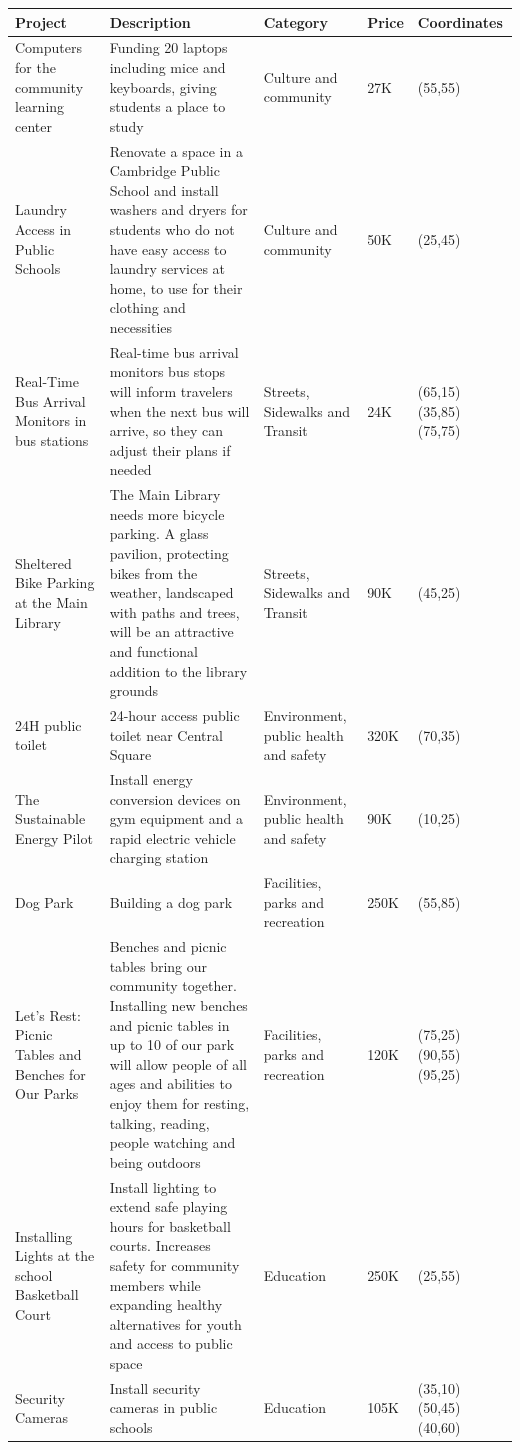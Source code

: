 \documentclass[letterpaper]{article} %
\begin{document}
\begin{table}[ht!]
  \begin{center}
    \begin{tabular}{|p{2cm}|p{8cm}|p{3cm}|p{1cm}|p{2cm}|}
    \hline
    \textbf{Project} & \textbf{Description} & \textbf{Category} & \textbf{Price} & \textbf{Coordinates}\\
    \hline
    Computers for the community learning center & Funding 20 laptops including mice and keyboards, giving students a place to study & Culture and community &  27K & (55,55)\\
    \hline
    Laundry Access in Public Schools & Renovate a space in a Cambridge Public School and install washers and dryers for students who do not have easy access to laundry services at home, to use for their clothing and necessities & Culture and community & 50K & (25,45)\\
    \hline
    Real-Time Bus Arrival Monitors in bus stations & Real-time bus arrival monitors bus stops will inform travelers when the next bus will arrive, so they can adjust their plans if needed &  Streets, Sidewalks and Transit &  24K & (65,15) (35,85) (75,75)\\
    \hline
    Sheltered Bike Parking at the Main Library & The Main Library needs more bicycle parking. A glass pavilion, protecting bikes from the weather, landscaped with paths and trees, will be an attractive and functional addition to the library grounds & Streets, Sidewalks and Transit & 90K & (45,25)\\
    \hline
    24H public toilet & 24-hour access public toilet near Central Square & Environment, public health and safety & 320K & (70,35)\\
    \hline
    The Sustainable Energy Pilot & Install energy conversion devices on gym equipment and a rapid electric vehicle charging station & Environment, public health and safety & 90K & (10,25)\\
    \hline
    Dog Park & Building a dog park & Facilities, parks and recreation & 250K & (55,85)\\
    \hline
    Let’s Rest: Picnic Tables and Benches for Our Parks & Benches and picnic tables bring our community together. Installing new benches and picnic tables in up to 10 of our park will allow people of all ages and abilities to enjoy them for resting, talking, reading, people watching and being outdoors & Facilities, parks and recreation & 120K & (75,25) (90,55) (95,25)\\
    \hline
    Installing Lights at the school Basketball Court & Install lighting to extend safe playing hours for basketball courts. Increases safety for community members while expanding healthy alternatives for youth and access to public space & Education & 250K & (25,55)\\
    \hline
    Security Cameras & Install security cameras in public schools & Education & 105K & (35,10) (50,45) (40,60)\\
        

\end{tabular}
\end{center}
\end{table}
\end{document}
